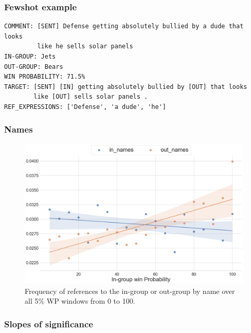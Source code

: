 \begin{frame}[fragile]\frametitle{Fewshot example}

\begin{verbatim}
COMMENT: [SENT] Defense getting absolutely bullied by a dude that looks 
         like he sells solar panels
IN-GROUP: Jets
OUT-GROUP: Bears
WIN PROBABILITY: 71.5%
TARGET: [SENT] [IN] getting absolutely bullied by [OUT] that looks 
        like [OUT] sells solar panels .
REF_EXPRESSIONS: ['Defense', 'a dude', 'he']
\end{verbatim}

\end{frame}

\begin{frame}[c]\frametitle{Names}
    \begin{figure}[t]
        \centering
        \includegraphics[width=0.85\linewidth]{figures/trends-5.png}
        \caption{Frequency of references to the in-group or out-group by name over all 5\% WP windows from 0 to 100.}
        \label{fig:trends-5}
    \end{figure}
\end{frame}

\begin{frame}[c]\frametitle{Slopes of significance}
    
\end{frame}

